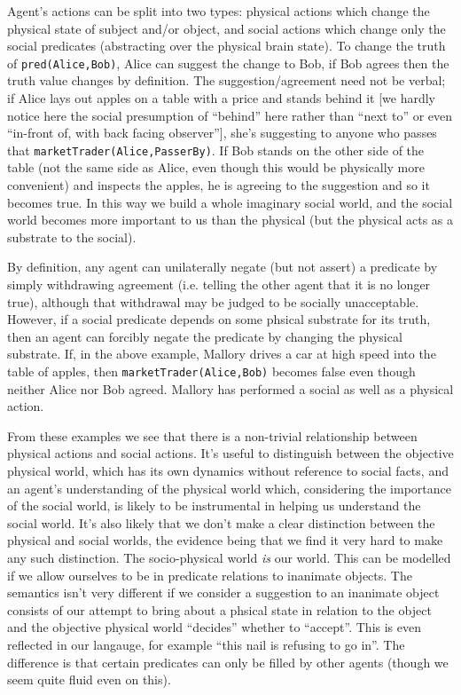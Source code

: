 \documentclass[a4paper]{article}
\begin{document}
Agent's actions can be split into two types: physical actions which change the physical state of subject and/or object, and social actions which change only the social predicates (abstracting over the physical brain state). To change the truth of \texttt{pred(Alice,Bob)}, Alice can suggest the change to Bob, if Bob agrees then the truth value changes by definition. The suggestion/agreement need not be verbal; if Alice lays out apples on a table with a price and stands behind it [we hardly notice here the social presumption of ``behind'' here rather than ``next to'' or even ``in-front of, with back facing observer''], she's suggesting to anyone who passes that \texttt{marketTrader(Alice,PasserBy)}. If Bob stands on the other side of the table (not the same side as Alice, even though this would be physically more convenient) and inspects the apples, he is agreeing to the suggestion and so it becomes true. In this way we build a whole imaginary social world, and the social world becomes more important to us than the physical (but the physical acts as a substrate to the social).

By definition, any agent can unilaterally negate (but not assert) a predicate by simply withdrawing agreement (i.e. telling the other agent that it is no longer true), although that withdrawal may be judged to be socially unacceptable. However, if a social predicate depends on some phsical substrate for its truth, then an agent can forcibly negate the predicate by changing the physical substrate. If, in the above example, Mallory drives a car at high speed into the table of apples, then \texttt{marketTrader(Alice,Bob)} becomes false even though neither Alice nor Bob agreed. Mallory has performed a social as well as a physical action.

From these examples we see that there is a non-trivial relationship between physical actions and social actions. It's useful to distinguish between the objective physical world, which has its own dynamics without reference to social facts, and an agent's understanding of the physical world which, considering the importance of the social world, is likely to be instrumental in helping us understand the social world. It's also likely that we don't make a clear distinction between the physical and social worlds, the evidence being that we find it very hard to make any such distinction. The socio-physical world \textit{is} our world. This can be modelled if we allow ourselves to be in predicate relations to inanimate objects. The semantics isn't very different if we consider a suggestion to an inanimate object consists of our attempt to bring about a phsical state in relation to the object and the objective physical world ``decides'' whether to ``accept''. This is even reflected in our langauge, for example ``this nail is refusing to go in''. The difference is that certain predicates can only be filled by other agents (though we seem quite fluid even on this).
\end{document}
